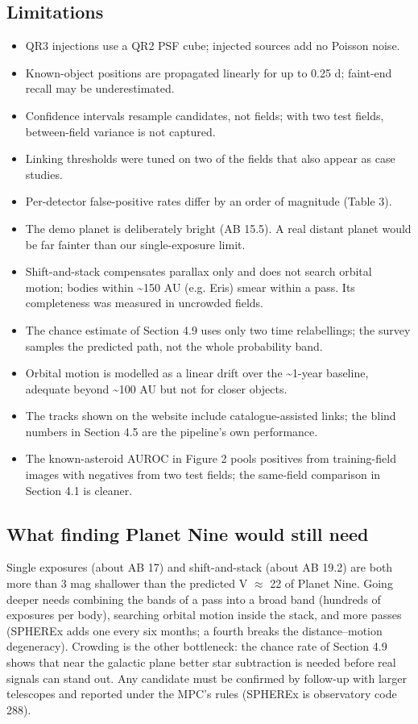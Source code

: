 \documentclass[twocolumn]{aastex631}
\begin{document}
\subsection{Limitations}
\begin{itemize}
\item QR3 injections use a QR2 PSF cube; injected sources add no Poisson noise.
\item Known-object positions are propagated linearly for up to 0.25 d; faint-end recall may be underestimated.
\item Confidence intervals resample candidates, not fields; with two test fields, between-field variance is not captured.
\item Linking thresholds were tuned on two of the fields that also appear as case studies.
\item Per-detector false-positive rates differ by an order of magnitude (Table 3).
\item The demo planet is deliberately bright (AB 15.5). A real distant planet would be far fainter than our single-exposure limit.
\item Shift-and-stack compensates parallax only and does not search orbital motion; bodies within \textasciitilde{}150 AU (e.g. Eris) smear within a pass. Its completeness was measured in uncrowded fields.
\item The chance estimate of Section 4.9 uses only two time relabellings; the survey samples the predicted path, not the whole probability band.
\item Orbital motion is modelled as a linear drift over the \textasciitilde{}1-year baseline, adequate beyond \textasciitilde{}100 AU but not for closer objects.
\item The tracks shown on the website include catalogue-assisted links; the blind numbers in Section 4.5 are the pipeline's own performance.
\item The known-asteroid AUROC in Figure 2 pools positives from training-field images with negatives from two test fields; the same-field comparison in Section 4.1 is cleaner.
\end{itemize}

\subsection{What finding Planet Nine would still need}
Single exposures (about AB 17) and shift-and-stack (about AB 19.2) are both more than 3 mag shallower than the predicted V $\approx$ 22 of Planet Nine. Going deeper needs combining the bands of a pass into a broad band (hundreds of exposures per body), searching orbital motion inside the stack, and more passes (SPHEREx adds one every six months; a fourth breaks the distance--motion degeneracy). Crowding is the other bottleneck: the chance rate of Section 4.9 shows that near the galactic plane better star subtraction is needed before real signals can stand out. Any candidate must be confirmed by follow-up with larger telescopes and reported under the MPC's rules (SPHEREx is observatory code 288).
\end{document}
